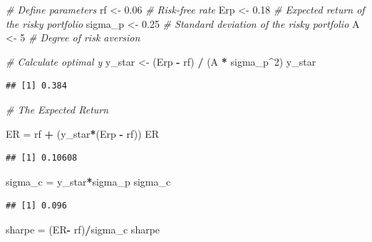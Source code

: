 \documentclass[
]{book}
\newenvironment{Shaded}{\begin{snugshade}}{\end{snugshade}}
\newcommand{\CommentTok}[1]{\textcolor[rgb]{0.56,0.35,0.01}{\textit{#1}}}
\newcommand{\DecValTok}[1]{\textcolor[rgb]{0.00,0.00,0.81}{#1}}
\newcommand{\FloatTok}[1]{\textcolor[rgb]{0.00,0.00,0.81}{#1}}
\newcommand{\NormalTok}[1]{#1}
\newcommand{\OtherTok}[1]{\textcolor[rgb]{0.56,0.35,0.01}{#1}}
\newcommand{\SpecialCharTok}[1]{\textcolor[rgb]{0.81,0.36,0.00}{\textbf{#1}}}
\begin{document}
\begin{Shaded}
\begin{Highlighting}[]
\CommentTok{\# Define parameters}
\NormalTok{rf }\OtherTok{\textless{}{-}} \FloatTok{0.06}       \CommentTok{\# Risk{-}free rate}
\NormalTok{Erp }\OtherTok{\textless{}{-}} \FloatTok{0.18}      \CommentTok{\# Expected return of the risky portfolio}
\NormalTok{sigma\_p }\OtherTok{\textless{}{-}} \FloatTok{0.25}  \CommentTok{\# Standard deviation of the risky portfolio}
\NormalTok{A }\OtherTok{\textless{}{-}} \DecValTok{5}           \CommentTok{\# Degree of risk aversion}

\CommentTok{\# Calculate optimal y}
\NormalTok{y\_star }\OtherTok{\textless{}{-}}\NormalTok{ (Erp }\SpecialCharTok{{-}}\NormalTok{ rf) }\SpecialCharTok{/}\NormalTok{ (A }\SpecialCharTok{*}\NormalTok{ sigma\_p}\SpecialCharTok{\^{}}\DecValTok{2}\NormalTok{)}
\NormalTok{y\_star}
\end{Highlighting}
\end{Shaded}

\begin{verbatim}
## [1] 0.384
\end{verbatim}

\begin{Shaded}
\begin{Highlighting}[]
\CommentTok{\# The Expected Return}

\NormalTok{ER }\OtherTok{=}\NormalTok{ rf }\SpecialCharTok{+}\NormalTok{ (y\_star}\SpecialCharTok{*}\NormalTok{(Erp }\SpecialCharTok{{-}}\NormalTok{ rf))}
\NormalTok{ER}
\end{Highlighting}
\end{Shaded}

\begin{verbatim}
## [1] 0.10608
\end{verbatim}

\begin{Shaded}
\begin{Highlighting}[]
\NormalTok{sigma\_c }\OtherTok{=}\NormalTok{ y\_star}\SpecialCharTok{*}\NormalTok{sigma\_p}
\NormalTok{sigma\_c}
\end{Highlighting}
\end{Shaded}

\begin{verbatim}
## [1] 0.096
\end{verbatim}

\begin{Shaded}
\begin{Highlighting}[]
\NormalTok{sharpe }\OtherTok{=}\NormalTok{ (ER}\SpecialCharTok{{-}}\NormalTok{ rf)}\SpecialCharTok{/}\NormalTok{sigma\_c}
\NormalTok{sharpe}
\end{Highlighting}
\end{Shaded}
\end{document}

